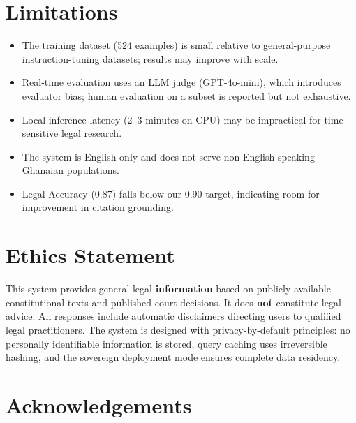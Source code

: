 \documentclass[11pt]{article}
\begin{document}
\section*{Limitations}

\begin{itemize}
    \item The training dataset (524 examples) is small relative to
    general-purpose instruction-tuning datasets; results may improve
    with scale.
    \item Real-time evaluation uses an LLM judge (GPT-4o-mini), which
    introduces evaluator bias; human evaluation on a subset is reported
    but not exhaustive.
    \item Local inference latency (2--3 minutes on CPU) may be
    impractical for time-sensitive legal research.
    \item The system is English-only and does not serve
    non-English-speaking Ghanaian populations.
    \item Legal Accuracy (0.87) falls below our 0.90 target, indicating
    room for improvement in citation grounding.
\end{itemize}


\section*{Ethics Statement}

This system provides general legal \textbf{information} based on publicly
available constitutional texts and published court decisions. It does
\textbf{not} constitute legal advice. All responses include automatic
disclaimers directing users to qualified legal practitioners. The system
is designed with privacy-by-default principles: no personally identifiable
information is stored, query caching uses irreversible hashing, and
the sovereign deployment mode ensures complete data residency.


\section*{Acknowledgements}
\end{document}
